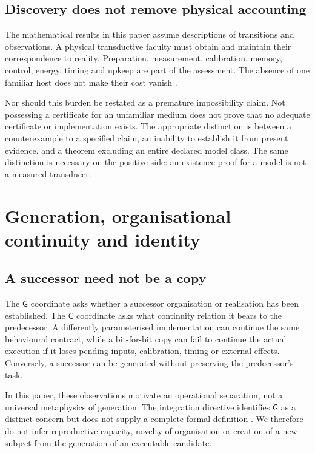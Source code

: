 \subsection{Discovery does not remove physical accounting}

The mathematical results in this paper assume descriptions of transitions and observations. A physical transductive faculty must obtain and maintain their correspondence to reality. Preparation, measurement, calibration, memory, control, energy, timing and upkeep are part of the assessment. The absence of one familiar host does not make their cost vanish \cite[\S\S6,13,16]{LM3}.

Nor should this burden be restated as a premature impossibility claim. Not possessing a certificate for an unfamiliar medium does not prove that no adequate certificate or implementation exists. The appropriate distinction is between a counterexample to a specified claim, an inability to establish it from present evidence, and a theorem excluding an entire declared model class. The same distinction is necessary on the positive side: an existence proof for a model is not a measured transducer.

\section{Generation, organisational continuity and identity}
\label{sec:identity}

\subsection{A successor need not be a copy}

The \(\mathsf G\) coordinate asks whether a successor organisation or realisation has been established. The \(\mathsf C\) coordinate asks what continuity relation it bears to the predecessor. A differently parameterised implementation can continue the same behavioural contract, while a bit-for-bit copy can fail to continue the actual execution if it loses pending inputs, calibration, timing or external effects. Conversely, a successor can be generated without preserving the predecessor's task.

In this paper, these observations motivate an operational separation, not a universal metaphysics of generation. The integration directive identifies \(\mathsf G\) as a distinct concern but does not supply a complete formal definition \cite{REC}. We therefore do not infer reproductive capacity, novelty of organisation or creation of a new subject from the generation of an executable candidate.

